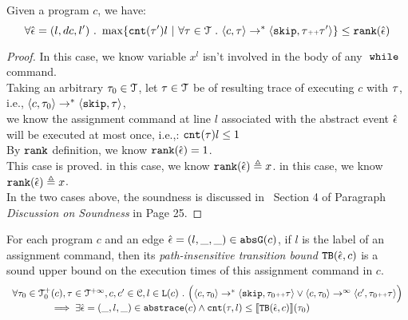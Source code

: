   \begin{lem}
    \label{lem:local_bound_sound}
  Given a program ${c}$, we have:
  \[
  \forall \absevent = (l, dc, l') \st 
  \max \left\{ \counter(\vtrace') l ~ \middle\vert~
  \forall \vtrace \in \mathcal{T} \st \config{{c}, \trace} \to^{*} \config{\eskip, \trace\tracecat\vtrace'} \right\} 
  \leq 
  \locbound(\absevent)
  \]
  \end{lem}
  \begin{proof}
    In this case, we know variable $x^l$ isn't involved in the body of any $\;\mathtt{while}\;$ command. 
    \\
    Taking an arbitrary $\mathtt{\tau}_0 \in \mathcal{T}$, 
    let $\mathtt{\tau} \in \mathcal{T}$ be of resulting trace of executing $c$ with $\mathtt{\tau}$, 
    i.e., $\langle {c}, \mathtt{\tau}_0 \rangle \to^{*} \langle \mathtt{skip}, \mathtt{\tau} \rangle$,
    \\
    we know the
    assignment command at line $l$ associated with the abstract event $\hat{\mathtt{\epsilon}{}}$ will be executed at most once, i.e.,:
    $\mathtt{cnt}(\mathtt{\tau}) l \leq 1$
    \\
    By $\mathtt{rank}$ definition, we know $\mathtt{rank}(\hat{\mathtt{\epsilon}{}}) = 1$.
    \\
    This case is proved.
      in this case, we know $\mathtt{rank}(\hat{\mathtt{\epsilon}{}}) \triangleq x$.
      in this case, we know $\mathtt{rank}(\hat{\mathtt{\epsilon}{}}) \triangleq x$.
    \\
    In the two cases above, the soundness is discussed in~\cite{sinn2017complexity} Section 4 of Paragraph \emph{Discussion on Soundness} in Page 25.
  \end{proof}
  \begin{thm}
    For each program ${c}$ and an edge $\hat{\mathtt{\epsilon}{}} = (l, \_, \_) \in \mathtt{abs}{\mathtt{G}}(c)$, if $l$ is the label of an assignment command,
    then its \emph{path-insensitive transition bound} ${\mathtt{TB}}(\hat{\mathtt{\epsilon}{}}, c)$ 
     is a sound upper bound on 
    the execution times of this assignment command in $c$.
      \[
        \begin{array}{l}
          \forall \mathtt{\tau}_0 \in \mathcal{T}^{+}_0(c), \mathtt{\tau} \in \mathcal{T}^{+\infty}, c, c' \in \mathcal{C}, l \in \mathtt{L}(c) ~.~
          \Big( \langle c, \mathtt{\tau}_0 \rangle \rightarrow^{*} \langle \mathtt{skip}, \mathtt{\tau}_0 {\scriptscriptstyle ++} \mathtt{\tau} \rangle 
            \lor  \langle c, \mathtt{\tau}_0 \rangle \rightarrow^{\infty} \langle c', \mathtt{\tau}_0 {\scriptscriptstyle ++} \mathtt{\tau} \rangle \Big)
           \\ \qquad \qquad
           \implies \exists \hat{\mathtt{\epsilon}{}} = (\_, l, \_) \in \mathtt{abs}{\mathtt{trace}}(c) \land
          \mathtt{cnt}(\mathtt{\tau}, l) \leq \llbracket {\ensuremath{\mathtt{TB}}}(\hat{\mathtt{\epsilon}{}}, c) \rrbracket(\mathtt{\tau}_0)
        \end{array}
      \]
  \end{thm}
